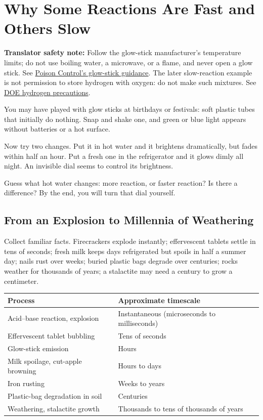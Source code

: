 \chapter{Why Some Reactions Are Fast and Others Slow}

\begin{kaichang}
\textbf{Translator safety note:} Follow the glow-stick manufacturer's temperature limits; do not use boiling water, a microwave, or a flame, and never open a glow stick. See \href{https://www.poison.org/articles/glow-sticks}{Poison Control's glow-stick guidance}. The later slow-reaction example is not permission to store hydrogen with oxygen: do not make such mixtures. See \href{https://www.energy.gov/cmei/fuels/safe-use-hydrogen}{DOE hydrogen precautions}.

You may have played with glow sticks at birthdays or festivals: soft plastic tubes that initially do nothing. Snap and shake one, and green or blue light appears without batteries or a hot surface.

Now try two changes. Put it in hot water and it brightens dramatically, but fades within half an hour. Put a fresh one in the refrigerator and it glows dimly all night. An invisible dial seems to control its brightness.

Guess what hot water changes: more reaction, or faster reaction? Is there a difference? By the end, you will turn that dial yourself.
\end{kaichang}

\section{From an Explosion to Millennia of Weathering}

Collect familiar facts. Firecrackers explode instantly; effervescent tablets settle in tens of seconds; fresh milk keeps days refrigerated but spoils in half a summer day; nails rust over weeks; buried plastic bags degrade over centuries; rocks weather for thousands of years; a stalactite may need a century to grow a centimeter.

\begin{table}[htbp]
\centering
\begin{tabular}{ll}
\toprule
\textbf{Process} & \textbf{Approximate timescale}\\
\midrule
Acid--base reaction, explosion & Instantaneous (microseconds to milliseconds)\\
Effervescent tablet bubbling & Tens of seconds\\
Glow-stick emission & Hours\\
Milk spoilage, cut-apple browning & Hours to days\\
Iron rusting & Weeks to years\\
Plastic-bag degradation in soil & Centuries\\
Weathering, stalactite growth & Thousands to tens of thousands of years\\
\bottomrule
\end{tabular}
\end{table}


